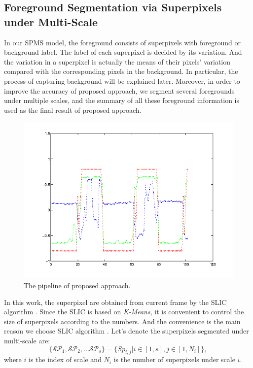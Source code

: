 \documentclass[runningheads,a4paper]{llncs}
\begin{document}
\subsection{Foreground Segmentation via Superpixels under Multi-Scale}
\label{model_segmentation}
In our SPMS model, the foreground consists of superpixels with foreground or
background label.
The label of each superpixel is decided by its variation.
And the variation in a superpixel is actually the means of their pixels'
variation compared with the corresponding pixels in the background.
In particular, the process of capturing background will be explained later.
Moreover, in order to improve the accuracy of proposed approach, we segment
several foregrounds under multiple scales, and the summary of all these
foreground information is used as the final result of proposed approach.

\begin{figure}
    \centering
    \includegraphics[width=\textwidth]{figure/fig1}
    \caption{The pipeline of proposed approach.}
    \label{flow_chart}
\end{figure}
In this work, the superpixel are obtained from current frame by the SLIC algorithm \cite{2012_TPAMI_SLIC}.
Since the SLIC \cite{2012_TPAMI_SLIC} is based on \emph{K-Means}, it is
convenient to control the size of superpixels according to the numbers.
%
And the convenience is the main reason we choose SLIC algorithm
\cite{2012_TPAMI_SLIC}.
Let's denote the superpixels segmented under multi-scale are:
\begin{equation}
\{\mathcal{SP}_1,
\mathcal{SP}_2, \dots \mathcal{SP}_s \} = \{ Sp_{i,j}|i \in [1,s], j \in [1,N_i] \},
\end{equation}
where $i$ is the index of scale and $N_i$ is the number of superpixels under scale $i$.
\end{document}

